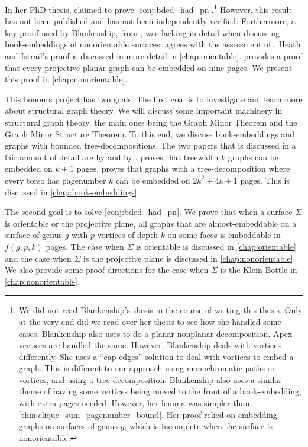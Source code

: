 In her PhD thesis, \textcite{Blankenship-PhD03} claimed to prove \cref{conj:bded_had_pn}.\footnote{
	We did not read Blankenship's thesis in the course of writing this thesis. Only at the very end did we read over her thesis to see how she handled some cases. 
	Blankenship also uses \textcite{heathPagenumberGenusGraphs1992} to do a planar-nonplanar decomposition. Apex vertices are handled the same. However, Blankenship deals with vortices differently. She uses a ``cap edges'' solution to deal with vortices to embed a graph. This is different to our approach using monochromatic paths on vortices, and using a tree-decomposition. 
	Blankenship also uses a similar theme of having some vertices being moved to the front of a book-embedding, with extra pages needed. However, her lemma was simpler than \cref{thm:clique_sum_pagenumber_bound}. Her proof relied on \textcite{heathPagenumberGenusGraphs1992} embedding graphs on surfaces of genus $g$, which is incomplete when the surface is nonorientable. 
} However, this result has not been published and has not been independently verified. Furthermore, a key proof used by Blankenship, from \textcite{heathPagenumberGenusGraphs1992}, was lacking in detail when discussing book-embeddings of nonorientable surfaces. \textcite{nakamotoBookEmbeddingProjectiveplanar2015} agrees with ths assessment of \textcite{heathPagenumberGenusGraphs1992}. Heath and Istrail's proof is discussed in more detail in \cref{chap:orientable}. \textcite{nakamotoBookEmbeddingProjectiveplanar2015} provides a proof that every projective-planar graph can be embedded on nine pages. We present this proof in \cref{chap:nonorientable}. 

This honours project has two goals. The first goal is to investigate and learn more about structural graph theory. We will discuss some important machinery in structural graph theory, the main ones being the Graph Minor Theorem and the Graph Minor Structure Theorem. To this end, we discuss book-embeddings and graphs with bounded tree-decompositions. The two papers that is discussed in a fair amount of detail are by \textcite{hickingbothamStackNumberCliqueSum2023} and by \textcite{ganleyPagenumberTrees2001}. \textcite{ganleyPagenumberTrees2001} proves that treewidth $k$ graphs can be embedded on $k+1$ pages. \textcite{hickingbothamStackNumberCliqueSum2023} proves that graphs with a tree-decomposition where every torso has pagenumber $k$ can be embedded on $2k^2 + 4k + 1$ pages. This is discussed in \cref{chap:book-embeddings}.

The second goal is to solve \cref{conj:bded_had_pn}. We prove that when a surface $\Sigma$ is orientable or the projective plane, all graphs that are almost-embeddable on a surface of genus $g$ with $p$ vortices of depth $k$ on some faces is embeddable in $f(g, p, k)$ pages. The case when $\Sigma$ is orientable is discussed in \cref{chap:orientable} and the case when $\Sigma$ is the projective plane is discussed in \cref{chap:nonorientable}. We also provide some proof directions for the case when $\Sigma$ is the Klein Bottle in \cref{chap:nonorientable}. 

